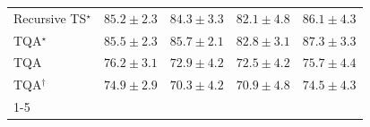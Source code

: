 \begin{tabular}{l|cccc|}
Recursive TS$^\star$ & {\cellcolor[HTML]{034D79}} \color[HTML]{F1F1F1} $85.2\pm 2.3$ & {\cellcolor[HTML]{045585}} \color[HTML]{F1F1F1} $84.3\pm 3.3$ & {\cellcolor[HTML]{046299}} \color[HTML]{F1F1F1} $82.1\pm 4.8$ & {\cellcolor[HTML]{03476F}} \color[HTML]{F1F1F1} $86.1\pm 4.3$ \\
TQA$^\star$ & {\cellcolor[HTML]{034B76}} \color[HTML]{F1F1F1} $85.5\pm 2.3$ & {\cellcolor[HTML]{034A74}} \color[HTML]{F1F1F1} $85.7\pm 2.1$ & {\cellcolor[HTML]{045E94}} \color[HTML]{F1F1F1} $82.8\pm 3.1$ & {\cellcolor[HTML]{023D60}} \color[HTML]{F1F1F1} $87.3\pm 3.3$ \\
TQA & {\cellcolor[HTML]{2685BB}} \color[HTML]{F1F1F1} $76.2\pm 3.1$ & {\cellcolor[HTML]{509AC6}} \color[HTML]{F1F1F1} $72.9\pm 4.2$ & {\cellcolor[HTML]{569DC8}} \color[HTML]{F1F1F1} $72.5\pm 4.2$ & {\cellcolor[HTML]{2C89BD}} \color[HTML]{F1F1F1} $75.7\pm 4.4$ \\
TQA$^\dagger$ & {\cellcolor[HTML]{348EBF}} \color[HTML]{F1F1F1} $74.9\pm 2.9$ & {\cellcolor[HTML]{73A9CF}} \color[HTML]{F1F1F1} $70.3\pm 4.2$ & {\cellcolor[HTML]{6BA5CD}} \color[HTML]{F1F1F1} $70.9\pm 4.8$ & {\cellcolor[HTML]{3991C1}} \color[HTML]{F1F1F1} $74.5\pm 4.3$ \\
\cline{1-5}
\bottomrule
\end{tabular}
